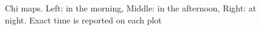 \documentclass[article]{jss}
\begin{document}
\begin{figure}[!h]
  \centering
  \caption{Chi maps. Left: in the morning, Middle: in the afternoon, Right: at night.  Exact time is reported on each plot}
  \label{bijingchi}
  \end{figure}
\end{document}
